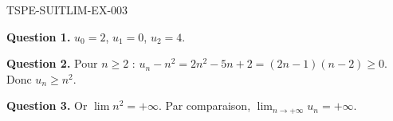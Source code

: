 \begin{corrige}{TSPE-SUITLIM-EX-003}

\textbf{Question 1.} $u_0 = 2$, $u_1 = 0$, $u_2 = 4$.


\textbf{Question 2.} Pour $n \geq 2$ : $u_n - n^2 = 2n^2 - 5n + 2 = (2n - 1)(n - 2) \geq 0$. Donc $u_n \geq n^2$.

\textbf{Question 3.} Or $\lim n^2 = +\infty$. Par comparaison, $\boxed{\lim_{n \to +\infty} u_n = +\infty}$.

\end{corrige}
